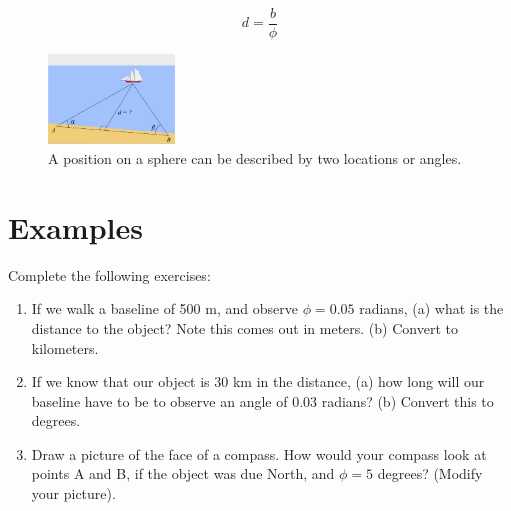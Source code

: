 \documentclass[12pt]{article}
\begin{document}
\begin{equation}
\boxed{
d = \frac{b}{\phi}}
\end{equation}
 
\begin{figure}[hb]
\centering
\includegraphics[width=0.3\textwidth]{triangulation-boat.png}
\caption{\label{fig:latlon} A position on a sphere can be described by two locations or angles.}
\end{figure}

\section{Examples}

Complete the following exercises:

\begin{enumerate}
\item If we walk a baseline of 500 m, and observe $\phi = 0.05$ radians, (a) what is the distance to the object? Note this comes out in meters.  (b) Convert to kilometers. \\ \vspace{1.5cm}
\item If we know that our object is 30 km in the distance, (a) how long will our baseline have to be to observe an angle of 0.03 radians? (b) Convert this to degrees. \\ \vspace{1.5cm}
\item Draw a picture of the face of a compass.  How would your compass look at points A and B, if the object was due North, and $\phi = 5$ degrees? (Modify your picture).
\end{enumerate}
\end{document}

